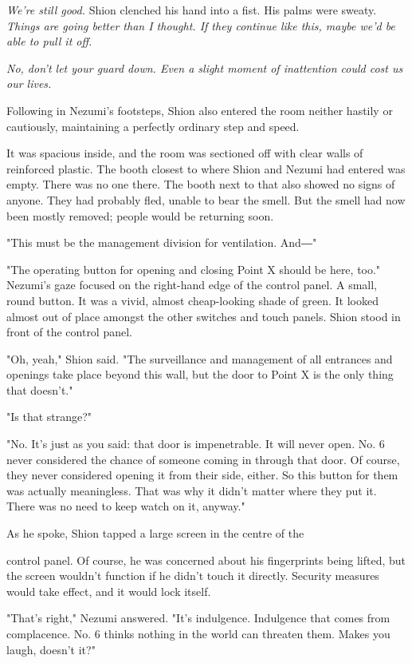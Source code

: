 \emph{We're still good.} Shion clenched his hand into a fist. His palms were
sweaty. \emph{Things are going better than I thought. If they continue like
	this, maybe we'd be able to pull it off.}

\emph{No, don't let your guard down. Even a slight moment of inattention could
	cost us our lives.}

Following in Nezumi's footsteps, Shion also entered the room neither
hastily or cautiously, maintaining a perfectly ordinary step and speed.

It was spacious inside, and the room was sectioned off with clear walls
of reinforced plastic. The booth closest to where Shion and Nezumi had
entered was empty. There was no one there. The booth next to that also
showed no signs of anyone. They had probably fled, unable to bear the
smell. But the smell had now been mostly removed; people would be
returning soon.

"This must be the management division for ventilation. And―"

"The operating button for opening and closing Point X should be here,
too." Nezumi's gaze focused on the right-hand edge of the control panel.
A small, round button. It was a vivid, almost cheap-looking shade of
green. It looked almost out of place amongst the other switches and
touch panels. Shion stood in front of the control panel.

"Oh, yeah," Shion said. "The surveillance and management of all
entrances and openings take place beyond this wall, but the door to
Point X is the only thing that doesn't."

"Is that strange?"

"No. It's just as you said: that door is impenetrable. It will never
open. No. 6 never considered the chance of someone coming in through
that door. Of course, they never considered opening it from their side,
either. So this button for them was actually meaningless. That was why
it didn't matter where they put it. There was no need to keep watch on
it, anyway."

As he spoke, Shion tapped a large screen in the centre of the~

control panel. Of course, he was concerned about his fingerprints being
lifted, but the screen wouldn't function if he didn't touch it directly.
Security measures would take effect, and it would lock itself.

"That's right," Nezumi answered. "It's indulgence. Indulgence that comes
from complacence. No. 6 thinks nothing in the world can threaten them.
Makes you laugh, doesn't it?"


